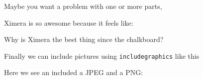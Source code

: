\documentclass{ximera}
\begin{document}
Maybe you want a problem with one or more parts,

\begin{exercise}
    Ximera is so awesome because it feels like:
    \begin{multipleChoice}
    \end{multipleChoice}
    \begin{exercise}
    Why is Ximera the best thing since the chalkboard?
    \begin{selectAll}
    \end{selectAll}
\end{exercise}
\end{exercise}

Finally we can include pictures using \verb|includegraphics| like this

Here we see an included a JPEG and a PNG:
\end{document}
